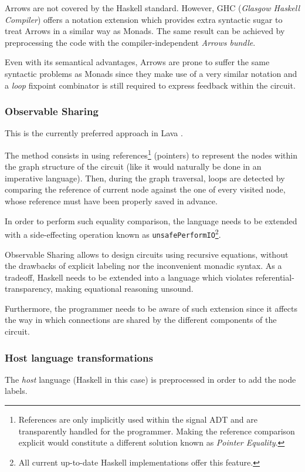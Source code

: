   Arrows are not covered by the Haskell standard. However, GHC
  (\textit{Glasgow Haskell Compiler}) offers a notation
  extension \cite{arrows:new} which provides extra syntactic
  sugar to treat Arrows in a similar way as Monads. The same result
  can be achieved by preprocessing the code with the compiler-independent
  \textit{Arrows bundle}.

  Even with its semantical advantages, Arrows are prone to suffer the same
  syntactic problems as Monads since they make use of a very similar
  notation and a \textit{loop} fixpoint combinator is still
  required to express feedback within the circuit.
  
  \subsubsection{Observable Sharing}  
  This is the currently preferred approach in Lava \cite{osharing}.
  
  The method consists in using references\footnote{References are only
    implicitly used within the signal ADT and are transparently
    handled for the programmer. Making the reference comparison
    explicit would constitute a different solution known as
    \textit{Pointer Equality}.} (pointers) to represent the nodes
  within the graph structure of the circuit (like it would naturally
  be done in an imperative language).  Then, during the graph
  traversal, loops are detected by comparing the reference of
  current node against the one of every visited node, whose reference
  must have been properly saved in advance.
  
  In order to perform such equality comparison, the language needs to
  be extended with a side-effecting operation known as
  \texttt{unsafePerformIO}\footnote{All current up-to-date Haskell
    implementations offer this feature.}.
  
  Observable Sharing allows to design circuits using recursive
  equations, without the drawbacks of explicit labeling nor the
  inconvenient monadic syntax.  As a tradeoff, Haskell needs to be
  extended into a language which violates referential-transparency,
  making equational reasoning unsound.
  
  Furthermore, the programmer needs to be aware of such extension
  since it affects the way in which connections are shared by the
  different components of the circuit.
  
  \subsubsection{Host language transformations}
  The \textit{host} language (Haskell in this case) is preprocessed in
  order to add the node labels.
  
